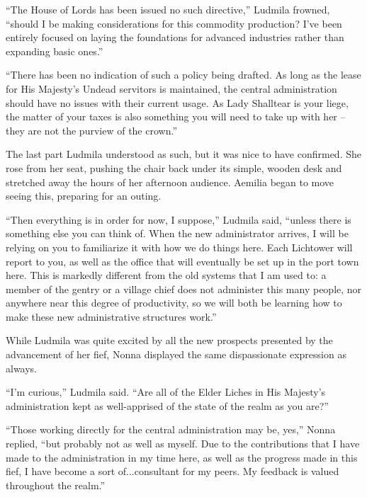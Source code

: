 “The House of Lords has been issued no such directive,” Ludmila frowned, “should I be making considerations for this commodity production? I’ve been entirely focused on laying the foundations for advanced industries rather than expanding basic ones.”

 

“There has been no indication of such a policy being drafted. As long as the lease for His Majesty’s Undead servitors is maintained, the central administration should have no issues with their current usage. As Lady Shalltear is your liege, the matter of your taxes is also something you will need to take up with her – they are not the purview of the crown.”

 

The last part Ludmila understood as such, but it was nice to have confirmed. She rose from her seat, pushing the chair back under its simple, wooden desk and stretched away the hours of her afternoon audience. Aemilia began to move seeing this, preparing for an outing.

 

“Then everything is in order for now, I suppose,” Ludmila said, “unless there is something else you can think of. When the new administrator arrives, I will be relying on you to familiarize it with how we do things here. Each Lichtower will report to you, as well as the office that will eventually be set up in the port town here. This is markedly different from the old systems that I am used to: a member of the gentry or a village chief does not administer this many people, nor anywhere near this degree of productivity, so we will both be learning how to make these new administrative structures work.”

 

While Ludmila was quite excited by all the new prospects presented by the advancement of her fief, Nonna displayed the same dispassionate expression as always.

 

“I’m curious,” Ludmila said. “Are all of the Elder Liches in His Majesty’s administration kept as well-apprised of the state of the realm as you are?”

 

“Those working directly for the central administration may be, yes,” Nonna replied, “but probably not as well as myself. Due to the contributions that I have made to the administration in my time here, as well as the progress made in this fief, I have become a sort of...consultant for my peers. My feedback is valued throughout the realm.”

